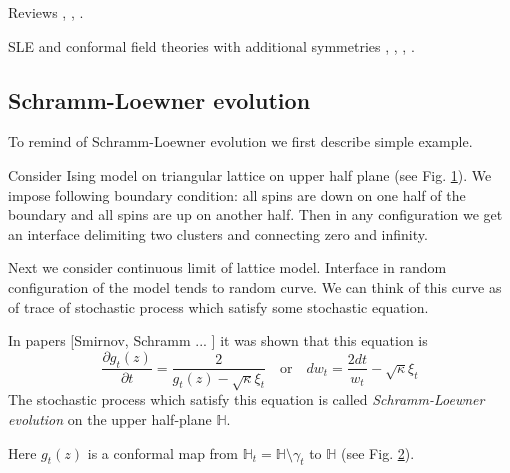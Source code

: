 \documentclass[12pt]{article}
\theoremstyle{definition}
\theoremstyle{definition} \newtheorem{Def}{Definition}
\begin{document}
Reviews \cite{rohde2005basic}, \cite{bauer20062d}, \cite{Cardy:2005kh}. 

SLE and conformal field theories with additional symmetries \cite{alekseev2010sle}, \cite{santachiara2008sle,picco2008numerical}, \cite{bettelheim2005stochastic}, \cite{Rasmussen:2004xr}.

\subsection{Schramm-Loewner evolution}
To remind of Schramm-Loewner evolution we first describe simple example.

Consider Ising model on triangular lattice on upper half plane (see Fig. \ref{fig:sle}). We impose following boundary condition: all spins are down on one half of the boundary and all spins are up on another half. Then in any configuration we get an interface delimiting two clusters and connecting zero and infinity. 

\begin{figure}[h]
  \label{fig:sle}
\end{figure}

Next we consider continuous limit of lattice model. Interface in random configuration of the model tends to random curve. We can think of this curve as of trace of stochastic process which satisfy some stochastic equation. 

In papers [Smirnov, Schramm ... ] it was shown that this equation is
\begin{equation*}
  \frac{\partial g_t(z)}{\partial t} = \frac{ 2}{g_t(z)-\sqrt{\kappa}\xi_{t}} \quad \text{or} \quad       d w _{t}= \frac{2dt}{w_{t} }-\sqrt{\kappa}\xi_{t}
\end{equation*}
The stochastic process which satisfy this equation is called     {\it Schramm-Loewner evolution} on the upper half-plane $\mathbb{H}$.

Here $g_{t}(z)$ is a conformal map from $\mathbb{H}_{t}=\mathbb{H}\setminus \gamma_{t}$ to $\mathbb{H}$ (see Fig. \ref{fig:sle2}).
\begin{figure}[h]
  \label{fig:sle2}
\end{figure}
\end{document}

